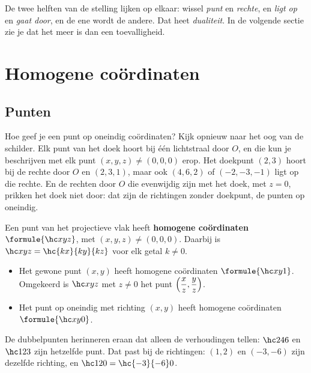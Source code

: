 De twee helften van de stelling lijken op elkaar: wissel \textit{punt} en \textit{rechte}, en \textit{ligt op} en \textit{gaat door}, en de ene wordt de andere. Dat heet \emph{dualiteit}. In de volgende sectie zie je dat het meer is dan een toevalligheid.

\begin{oefeningen}
\end{oefeningen}

\section{Homogene coördinaten}

\subsection{Punten}

Hoe geef je een punt op oneindig coördinaten? Kijk opnieuw naar het oog van de schilder. Elk punt van het doek hoort bij één lichtstraal door $O$, en die kun je beschrijven met elk punt $(x, y, z) \neq (0, 0, 0)$ erop. Het doekpunt $(2, 3)$ hoort bij de rechte door $O$ en $(2, 3, 1)$, maar ook $(4, 6, 2)$ of $(-2, -3, -1)$ ligt op die rechte. En de rechten door $O$ die evenwijdig zijn met het doek, met $z = 0$, prikken het doek niet door: dat zijn de richtingen zonder doekpunt, de punten op oneindig.

\begin{theorie}
Een punt van het projectieve vlak heeft \textbf{\textcolor{accent}{homogene coördinaten}} $\formule{\hc xyz}$, met $(x, y, z) \neq (0, 0, 0)$. Daarbij is $\hc xyz = \hc{kx}{ky}{kz}$ voor elk getal $k \neq 0$.
\begin{itemize}
\item Het gewone punt $(x, y)$ heeft homogene coördinaten $\formule{\hc xy1}$. Omgekeerd is $\hc xyz$ met $z \neq 0$ het punt $\Bigl(\dfrac xz, \dfrac yz\Bigr)$.
\item Het punt op oneindig met richting $(x, y)$ heeft homogene coördinaten $\formule{\hc xy0}$.
\end{itemize}
\end{theorie}

De dubbelpunten herinneren eraan dat alleen de verhoudingen tellen: $\hc246$ en $\hc123$ zijn hetzelfde punt. Dat past bij de richtingen: $(1, 2)$ en $(-3, -6)$ zijn dezelfde richting, en $\hc120 = \hc{-3}{-6}0$.

